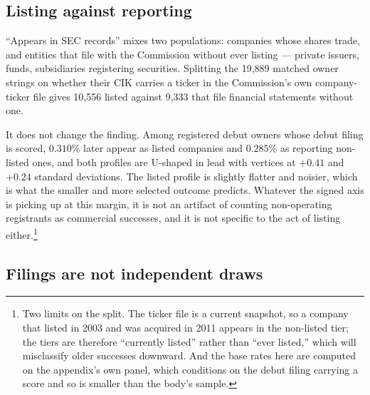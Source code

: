 \subsection{Listing against reporting}

``Appears in SEC records'' mixes two populations: companies whose shares trade, and entities that file with
the Commission without ever listing --- private issuers, funds, subsidiaries
registering securities. Splitting the 19{,}889 matched owner strings on whether
their CIK carries a ticker in the Commission's own company-ticker file gives
10{,}556 listed against 9{,}333 that file financial statements without one.

It does not change the finding. Among registered debut owners whose debut
filing is scored, $0.310$\% later appear as listed companies and $0.285$\% as
reporting non-listed ones, and both profiles are U-shaped in lead with vertices
at $+0.41$ and $+0.24$ standard deviations. The listed profile is slightly
flatter and noisier, which is what the smaller and more selected outcome
predicts. Whatever the signed axis is picking up at this margin, it is not an
artifact of counting non-operating registrants as commercial successes, and it
is not specific to the act of listing either.\footnote{Two limits on the split.
The ticker file is a current snapshot, so a company that listed in 2003 and was
acquired in 2011 appears in the non-listed tier; the tiers are therefore
``currently listed'' rather than ``ever listed,'' which will misclassify older
successes downward. And the base rates here are computed on the appendix's own
panel, which conditions on the debut filing carrying a score and so is smaller
than the body's sample.}

\subsection{Filings are not independent draws}

